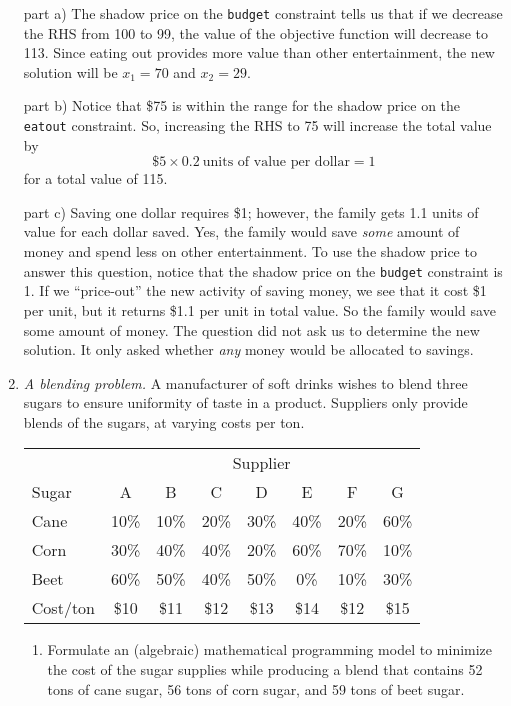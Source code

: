 \begin{enumerate}
\begin{solution}
part a) The shadow price on the \texttt{budget} constraint tells us
that if we decrease the RHS from 100 to 99, the value of the objective
function will decrease to 113. Since eating out provides more value
than other entertainment, the new solution will be $x_1=70$ and
$x_2=29$.

part b) Notice that \$75 is within the range for the shadow price on
the \texttt{eatout} constraint. So, increasing the RHS to 75 will
increase the total value by
\[ \$5 \times 0.2~\text{units of value per dollar} = 1 \]
for a total value of 115.

part c) Saving one dollar requires \$1; however, the family gets 1.1
units of value for each dollar saved. Yes, the family would save
\emph{some} amount of money and spend less on other entertainment. To
use the shadow price to answer this question, notice that the shadow
price on the \texttt{budget} constraint is 1. If we ``price-out'' the
new activity of saving money, we see that it cost \$1 per unit, but it
returns \$1.1 per unit in total value. So the family would save some
amount of money. The question did not ask us to determine the new
solution. It only asked whether \emph{any} money would be allocated to
savings.
\end{solution}

\item \emph{A blending problem.}
A manufacturer of soft drinks wishes to blend
three sugars to ensure uniformity of taste in a product. Suppliers
only provide blends of the sugars, at varying costs per ton.

\begin{center}
\begin{tabular}{lccccccc} \centering
 & \multicolumn{7}{c}{Supplier}\\
Sugar  &   A &  B &  C &  D &  E &  F &  G \\ \hline
Cane   &  10\% & 10\% & 20\% & 30\% & 40\% & 20\% & 60\% \\
Corn   &  30\% & 40\% & 40\% & 20\% & 60\% & 70\% & 10\% \\
Beet   &  60\% & 50\% & 40\% & 50\% &  0\% & 10\% & 30\% \\
Cost/ton& \$10 & \$11 & \$12 & \$13 & \$14 & \$12 & \$15
\end{tabular}
\end{center}

\begin{enumerate}
\item Formulate an (algebraic) mathematical programming model to minimize 
the cost of the sugar supplies while producing a blend that contains 52 tons
of cane sugar, 56 tons of corn sugar, and 59 tons of beet sugar. \label{ex:blenda}


\end{enumerate}
\end{enumerate}
